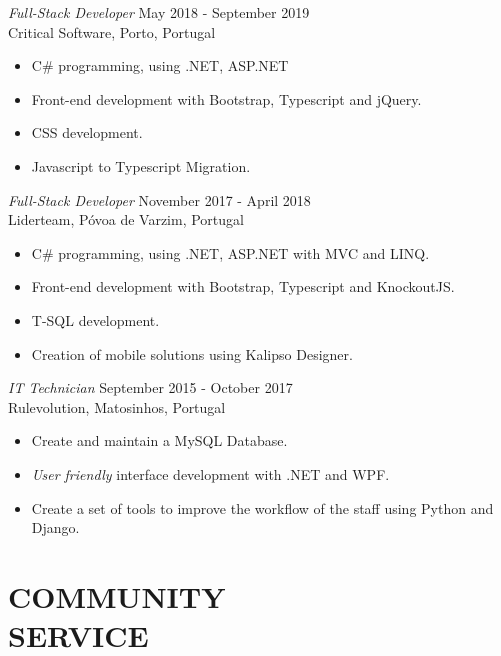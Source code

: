 \documentclass[margin, 10pt]{res} %
\begin{document}
\begin{resume}
    {\sl Full-Stack Developer} \hfill May 2018 - September 2019\\
    Critical Software, Porto, Portugal

    \begin{itemize} \itemsep -2pt %
        \item C\# programming, using .NET, ASP.NET
        \item Front-end development with Bootstrap, Typescript and jQuery.
        \item CSS development.
        \item Javascript to Typescript Migration.
    \end{itemize}

    {\sl Full-Stack Developer} \hfill November 2017 - April 2018\\
    Liderteam, Póvoa de Varzim, Portugal

    \begin{itemize} \itemsep -2pt %
        \item C\# programming, using .NET, ASP.NET with MVC and LINQ.
        \item Front-end development with Bootstrap, Typescript and KnockoutJS.
        \item T-SQL development.
        \item Creation of mobile solutions using Kalipso Designer.
    \end{itemize}

    {\sl IT Technician} \hfill September 2015 - October 2017\\
    Rulevolution, Matosinhos, Portugal

    \begin{itemize} \itemsep -2pt %
        \item Create and maintain a MySQL Database.
        \item {\sl User friendly} interface development with .NET and WPF.
        \item Create a set of tools to improve the workflow of the staff using Python and Django.
    \end{itemize}



    \section{COMMUNITY \\ SERVICE}


\end{resume}
\end{document}
